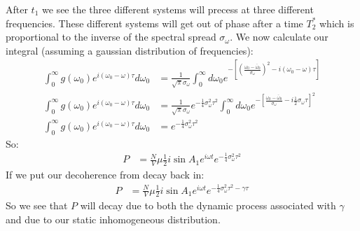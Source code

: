 After $t_1$ we see the three different systems will precess at three different frequencies. These different systems will get out of phase after a time $T_2^*$ which is proportional to the inverse of the spectral spread $\sigma_\omega$.
We now calculate our integral (assuming a gaussian distribution of frequencies):
\begin{align*}
	\int_0^\infty g(\omega_0) e^{i(\omega_0 - \omega)\tau} d\omega_0 &= \frac{1}{\sqrt{\pi}\sigma_\omega} \int_0^\infty d\omega_0 e^{-\left[\left(\frac{\omega_0 - \bar{\omega}_0}{\sigma_\omega}\right)^2 - i(\omega_0 - \omega) \tau\right]} \\
	\int_0^\infty g(\omega_0) e^{i(\omega_0 - \omega)\tau} d\omega_0 &= \frac{1}{\sqrt{\pi}\sigma_\omega} e^{-\frac{1}{4} \sigma_\omega^2\tau^2}
	\int_0^\infty d\omega_0 e^{-\left[\frac{\omega_0 - \bar{\omega}_0}{\sigma_\omega} - i\frac{1}{2}\sigma_\omega \tau\right]^2} \\
	\int_0^\infty g(\omega_0) e^{i(\omega_0 - \omega)\tau} d\omega_0 &= e^{-\frac{1}{4} \sigma_\omega^2\tau^2}
\end{align*}
So:
\begin{align*}
	P &= \frac{N}{V} \mu \frac{1}{2} i\sin A_1 e^{i\omega t} e^{-\frac{1}{4}\sigma_\omega^2\tau^2}
\end{align*}
If we put our decoherence from decay back in:
\begin{align*}
	P &= \frac{N}{V} \mu \frac{1}{2} i\sin A_1 e^{i\omega t} e^{-\frac{1}{4}\sigma_\omega^2\tau^2 - \gamma \tau}
\end{align*}
So we see that $P$ will decay due to both the dynamic process associated with $\gamma$ and due to our static inhomogeneous distribution.

